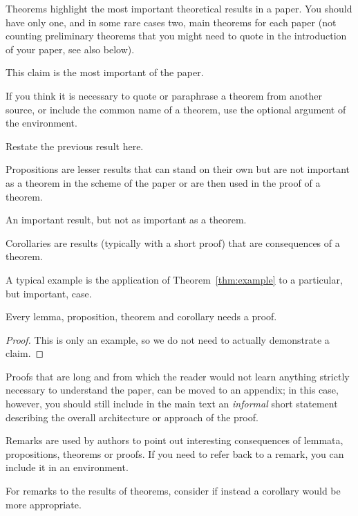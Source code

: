 \documentclass[letterpaper, 10 pt, conference]{ieeeconf}
\begin{document}
Theorems highlight the most important theoretical results in a paper. You should have only one, and in some rare cases two, main theorems for each paper (not counting preliminary theorems that you might need to quote in the introduction of your paper, see also below).
\begin{theorem}\label{thm:example}
  This claim is the most important of the paper.
\end{theorem}
If you think it is necessary to quote or paraphrase a theorem from another source, or include the common name of a theorem, use the optional argument of the environment.
\begin{theorem}
  Restate the previous result here.
\end{theorem}


Propositions are lesser results that can stand on their own but are not important as a theorem in the scheme of the paper or are then used in the proof of a theorem.
\begin{proposition}
  An important result, but not as important as a theorem.
\end{proposition}

Corollaries are results (typically with a short proof) that are consequences of a theorem.
\begin{corollary}
  A typical example is the application of Theorem~\ref{thm:example} to a particular, but important, case.
\end{corollary}

Every lemma, proposition, theorem and corollary needs a proof.

\begin{proof}
  This is only an example, so we do not need to actually demonstrate a claim.
\end{proof}
Proofs that are long and from which the reader would not learn anything strictly necessary to understand the paper, can be moved to an appendix; in this case, however, you should still include in the main text an \emph{informal} short statement describing the overall architecture or approach of the proof.

Remarks are used by authors to point out interesting consequences of lemmata, propositions, theorems or proofs. If you need to refer back to a remark, you can include it in an environment.

\begin{remark}
  For remarks to the results of theorems, consider if instead a corollary would be more appropriate.
\end{remark}
\end{document}
